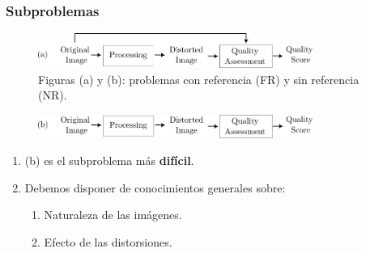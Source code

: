 \begin{frame}
  \frametitle{Subproblemas}
  \vspace{-.5cm}
  \begin{figure}
    \caption{Figuras (a) y (b): problemas con referencia (FR) y sin referencia (NR).}
    \includegraphics[width=0.8\textwidth]{imagenes/chapter1/HFullReferenceInk.png}
  \end{figure}
  \begin{figure}
    \includegraphics[width=0.8\textwidth]{imagenes/chapter1/NoReferenceInk.png}
  \end{figure}
  \begin{enumerate}
    \item (b) es el subproblema más \textbf{difícil}.
    \item Debemos disponer de conocimientos generales sobre: 
      \begin{enumerate}
        \item Naturaleza de las imágenes.
        \item Efecto de las distorsiones.
      \end{enumerate}
  \end{enumerate}
\end{frame}


